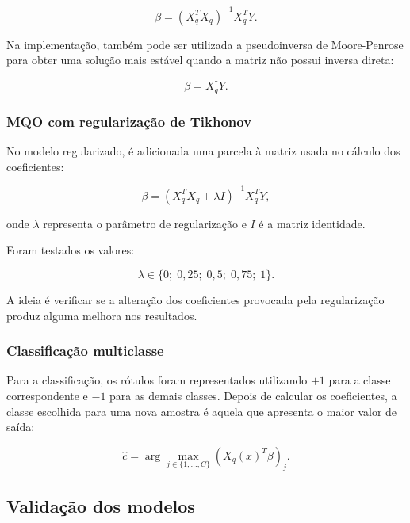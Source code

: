 \documentclass[conference]{IEEEtran}
\begin{document}
\begin{equation}
\beta = (X_q^T X_q)^{-1}X_q^T Y.
\end{equation}

Na implementação, também pode ser utilizada a pseudoinversa de Moore-Penrose para obter uma solução mais estável quando a matriz não possui inversa direta:

\begin{equation}
\beta = X_q^\dagger Y.
\end{equation}

\subsubsection{MQO com regularização de Tikhonov}

No modelo regularizado, é adicionada uma parcela à matriz usada no cálculo dos coeficientes:

\begin{equation}
\beta =
(X_q^T X_q+\lambda I)^{-1}X_q^T Y,
\end{equation}

onde $\lambda$ representa o parâmetro de regularização e $I$ é a matriz identidade.

Foram testados os valores:

\begin{equation}
\lambda \in \{0;\;0,25;\;0,5;\;0,75;\;1\}.
\end{equation}

A ideia é verificar se a alteração dos coeficientes provocada pela regularização produz alguma melhora nos resultados.

\subsubsection{Classificação multiclasse}

Para a classificação, os rótulos foram representados utilizando $+1$ para a classe correspondente e $-1$ para as demais classes. Depois de calcular os coeficientes, a classe escolhida para uma nova amostra é aquela que apresenta o maior valor de saída:

\begin{equation}
\hat{c} =
\arg\max_{j \in \{1,\dots,C\}}
\left(X_q(x)^T\beta\right)_j.
\end{equation}

\subsection{Validação dos modelos}
\end{document}
